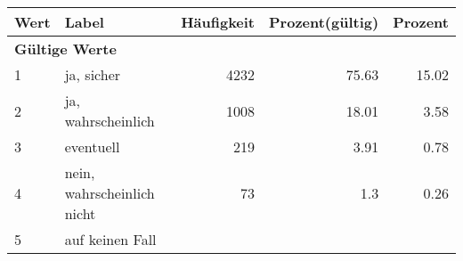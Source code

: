      \begin{longtable}{lXrrr}
     \toprule
     \textbf{Wert} & \textbf{Label} & \textbf{Häufigkeit} & \textbf{Prozent(gültig)} & \textbf{Prozent} \\
     \endhead
     \midrule
     \multicolumn{5}{l}{\textbf{Gültige Werte}}\\

     1 &
     \multicolumn{1}{X}{ ja, sicher   } &


       \num{4232} &
       \num[round-mode=places,round-precision=2]{75,63} &
         \num[round-mode=places,round-precision=2]{15,02} \\

     2 &
     \multicolumn{1}{X}{ ja, wahrscheinlich   } &


       \num{1008} &
       \num[round-mode=places,round-precision=2]{18,01} &
         \num[round-mode=places,round-precision=2]{3,58} \\

     3 &
     \multicolumn{1}{X}{ eventuell   } &


       \num{219} &
       \num[round-mode=places,round-precision=2]{3,91} &
         \num[round-mode=places,round-precision=2]{0,78} \\

     4 &
     \multicolumn{1}{X}{ nein, wahrscheinlich nicht   } &


       \num{73} &
       \num[round-mode=places,round-precision=2]{1,3} &
         \num[round-mode=places,round-precision=2]{0,26} \\

     5 &
     \multicolumn{1}{X}{ auf keinen Fall   } &



\end{longtable}
